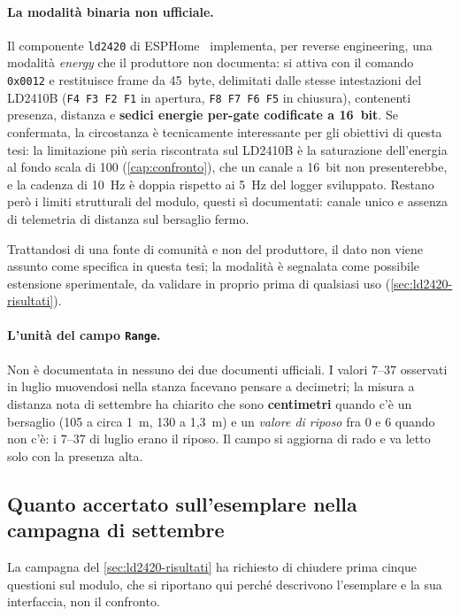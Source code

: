 \paragraph{La modalità binaria non ufficiale.} Il componente \texttt{ld2420} di
ESPHome~\cite{esphomeLD2420src} implementa, per reverse engineering, una modalità
\emph{energy} che il produttore non documenta: si attiva con il comando
\texttt{0x0012} e restituisce frame da 45~byte, delimitati dalle stesse
intestazioni del LD2410B (\texttt{F4 F3 F2 F1} in apertura, \texttt{F8 F7 F6 F5}
in chiusura), contenenti presenza, distanza e \textbf{sedici energie per-gate
codificate a 16~bit}. Se confermata, la circostanza è tecnicamente interessante
per gli obiettivi di questa tesi: la limitazione più seria riscontrata sul
LD2410B è la saturazione dell'energia al fondo scala di 100
(\cref{cap:confronto}), che un canale a 16~bit non presenterebbe, e la cadenza di
10~Hz è doppia rispetto ai 5~Hz del logger sviluppato. Restano però i limiti
strutturali del modulo, questi sì documentati: canale unico e assenza di
telemetria di distanza sul bersaglio fermo.

Trattandosi di una fonte di comunità e non del produttore, il dato non viene
assunto come specifica in questa tesi; la modalità è segnalata come possibile
estensione sperimentale, da validare in proprio prima di qualsiasi uso
(\cref{sec:ld2420-risultati}).

\paragraph{L'unità del campo \texttt{Range}.} Non è documentata in nessuno dei due
documenti ufficiali. I valori 7--37 osservati in luglio muovendosi nella stanza
facevano pensare a decimetri; la misura a distanza nota di settembre ha chiarito che
sono \textbf{centimetri} quando c'è un bersaglio (105 a circa 1~m, 130 a 1,3~m) e un
\emph{valore di riposo} fra 0 e 6 quando non c'è: i 7--37 di luglio erano il riposo.
Il campo si aggiorna di rado e va letto solo con la presenza alta.

\subsection{Quanto accertato sull'esemplare nella campagna di settembre}
\label{sec:ld2420-stato}

La campagna del \cref{sec:ld2420-risultati} ha richiesto di chiudere prima cinque
questioni sul modulo, che si riportano qui perché descrivono l'esemplare e la sua
interfaccia, non il confronto.

